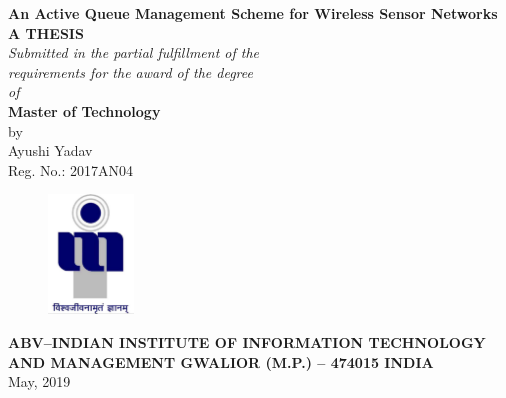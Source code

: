 \baselineskip=22pt
\begin{center}
{\bf \large{{\textup{\textbf{\textup{{An Active Queue Management Scheme for Wireless Sensor Networks}}}}}}
\\[0.4in]}
{\bf{\bf A THESIS}}\\[0.2in]
\emph{Submitted in the partial fulfillment of the\\
requirements for the award of the degree\\[0.2in]
of\\[0.2in]
}{\bf {{Master of Technology}}}\\[0.5in]
by\\[0.2in]
{ {Ayushi Yadav}}\\[0.1in]
{Reg. No.: 2017AN04}\\
\vspace{0.7in}
\begin{figure}[ht]
\centering
\includegraphics[height=1.25in,width=0.9in]{logo.pdf}\\
\end{figure}\vspace{0.8in}
{{\bf ABV--INDIAN INSTITUTE OF INFORMATION TECHNOLOGY AND MANAGEMENT GWALIOR (M.P.) -- 474015 INDIA\\[0.2in]}
}May, 2019
\end{center}
\newpage
